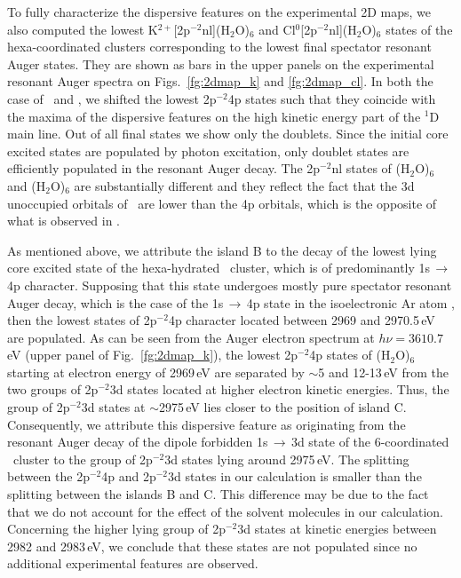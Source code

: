 To fully characterize the dispersive features on the experimental 2D maps, we also computed the lowest K$^{2+}$[2p$^{-2}$nl](H$_2$O)$_6$ and Cl$^{0}$[2p$^{-2}$nl](H$_2$O)$_6$ states of the hexa-coordinated clusters corresponding to the lowest final spectator resonant Auger states. They are shown as bars in the upper panels on the experimental resonant Auger spectra on Figs.\ \ref{fg:2dmap_k} and \ref{fg:2dmap_cl}. In both the case of \ki~and \cli, we shifted the lowest 2p$^{-2}$4p states such that they coincide with the maxima of the dispersive features on the high kinetic energy part of the $^1$D main line. Out of all final states we show only the doublets. Since the initial core excited states are populated by photon excitation, only doublet states are efficiently populated in the resonant Auger decay. The 2p$^{-2}$nl states of \ki(H$_2$O)$_6$ and \cli(H$_2$O)$_6$ are substantially different and they reflect the fact that the 3d unoccupied orbitals of \ki~are lower than the 4p orbitals, which is the opposite of what is observed in \cli. 


As mentioned above, we attribute the island B to the decay of the lowest lying core excited state of the hexa-hydrated \ki~cluster, which is of predominantly 1s$\,\rightarrow\,$4p character. Supposing that this state undergoes mostly pure spectator resonant Auger decay, which is the case of the 1s$\,\rightarrow\,$4p state in the isoelectronic Ar atom \citep{ceolin15:022502}, then the lowest states of 2p$^{-2}$4p character located between 2969 and 2970.5\,eV are populated. As can be seen from the Auger electron spectrum at $h\nu = 3610.7$\,eV (upper panel of Fig.\ \ref{fg:2dmap_k}), the lowest 2p$^{-2}$4p states of \ki(H$_2$O)$_6$ starting at electron energy of 2969\,eV are separated by $\sim$5 and 12-13\,eV from the two groups of 2p$^{-2}$3d states located at higher electron kinetic energies. Thus, the group of 2p$^{-2}$3d states at $\sim$2975\,eV lies closer to the position of island C. Consequently, we attribute this dispersive feature as originating from the resonant Auger decay of the dipole forbidden 1s$\,\rightarrow\,$3d state of the 6-coordinated \ki~cluster to the group of 2p$^{-2}$3d states lying around 2975\,eV. The splitting between the 2p$^{-2}$4p and 2p$^{-2}$3d states in our calculation is smaller than the splitting between the islands B and C. This difference may be due to the fact that we do not account for the effect of the solvent molecules in our calculation. Concerning the higher lying group of 2p$^{-2}$3d states at kinetic energies between 2982 and 2983\,eV, we conclude that these states are not populated since no additional experimental features are observed.

